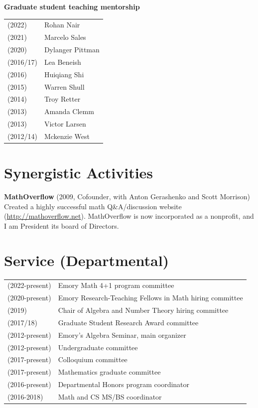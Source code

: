 \documentclass[margin,line]{res}
\begin{document}
\begin{resume}
{\bf Graduate student teaching mentorship}
\vspace*{-.15in}

\begin{tabular}{ll}
  (2022) & Rohan Nair \\
  (2021) & Marcelo Sales \\  
  (2020) & Dylanger Pittman \\
  (2016/17) & Lea Beneish \\
  (2016) & Huiqiang Shi                     \\
  (2015) & Warren Shull                     \\
  (2014) & Troy Retter \\
  (2013) & Amanda Clemm \\
  (2013) & Victor Larsen \\
  (2012/14) & Mckenzie West                     \\  
\end{tabular}

\newpage
\section{\sc Synergistic Activities}
{\bf MathOverflow} (2009, Cofounder, with Anton Gerashenko and Scott Morrison)\\
Created a highly successful math Q\&A/discussion website (\url{http://mathoverflow.net}). MathOverflow is now incorporated as a nonprofit, and I am President its board of Directors.


\section{\sc Service (Departmental)}

\begin{tabular}{ll}
 (2022-present) & Emory Math 4+1 program committee \\    
 (2020-present) & Emory Research-Teaching Fellows in Math hiring committee \\  
 (2019) & Chair of Algebra and Number Theory hiring committee \\
 (2017/18) & Graduate Student Research Award committee \\
 (2012-present) & Emory's Algebra Seminar, main organizer \\
 (2012-present) & Undergraduate committee \\
 (2017-present) & Colloquium committee     \\
 (2017-present) & Mathematics graduate committee  \\
 (2016-present) & Departmental Honors program coordinator  \\
 (2016-2018) & Math and CS MS/BS coordinator  \\



\end{tabular}
\end{resume}
\end{document}
